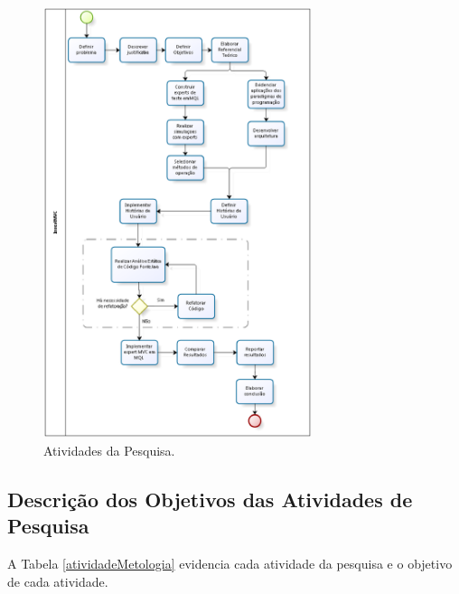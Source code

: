\begin{figure}[H]
\centering
\includegraphics[width=0.7\textwidth]{figuras/metodologiaTCC}
\caption{Atividades da Pesquisa.} 
\label{metodologia}
\end{figure}

\subsection{Descrição dos Objetivos das Atividades de Pesquisa}

A Tabela \ref{atividadeMetologia}  evidencia cada atividade da pesquisa e o objetivo de cada atividade.

